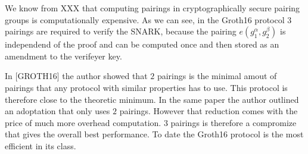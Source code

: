 We know from XXX that computing pairings in cryptographically secure pairing groups is computationally expensive. As we can see, in the Groth16 protocol $3$ pairings are required to verify the SNARK, because the pairing $e(g_1^\alpha,g_2^\beta)$ is independend of the proof and can be computed once and then stored as an amendment to the verifeyer key. 

In [GROTH16] the author showed that $2$ pairings is the minimal amout of pairings that any protocol with similar properties has to use. This protocol is therefore close to the theoretic minimum. In the same paper the author outlined an adoptation that only uses $2$ pairings. However that reduction comes with the price of much more overhead computation. $3$ pairings is therefore a compromize that gives the overall best performance. To date the Groth16 protocol is the most efficient in its class. 

